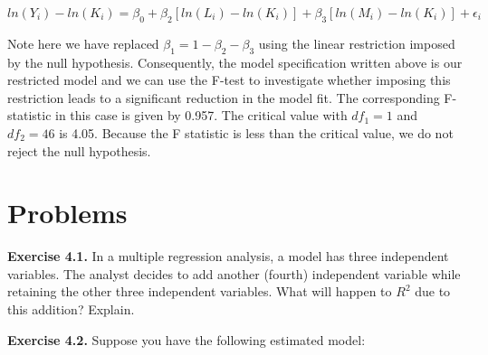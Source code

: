 \documentclass[
]{book}
\theoremstyle{definition}
\theoremstyle{definition}
\theoremstyle{definition}
\theoremstyle{definition}
\theoremstyle{remark}
\begin{document}
\[ln(Y_i)-ln(K_i) = \beta_0+ \beta_2 [ln (L_i)-ln(K_i)] +\beta_3 [ln (M_i)-ln(K_i)]+ \epsilon_i\]

Note here we have replaced \(\beta_1=1- \beta_2-\beta_3\) using the linear restriction imposed by the null hypothesis. Consequently, the model specification written above is our restricted model and we can use the F-test to investigate whether imposing this restriction leads to a significant reduction in the model fit. The corresponding F-statistic in this case is given by 0.957. The critical value with \(df_1=1\) and \(df_2=46\) is 4.05. Because the F statistic is less than the critical value, we do not reject the null hypothesis.

\hypertarget{problems-1}{%
\section*{Problems}\label{problems-1}}

\textbf{Exercise 4.1.} In a multiple regression analysis, a model has three independent variables. The analyst decides to add another (fourth) independent variable while retaining the other three independent variables. What will happen to \(R^2\) due to this addition? Explain.

\textbf{Exercise 4.2.} Suppose you have the following estimated model:
\end{document}
